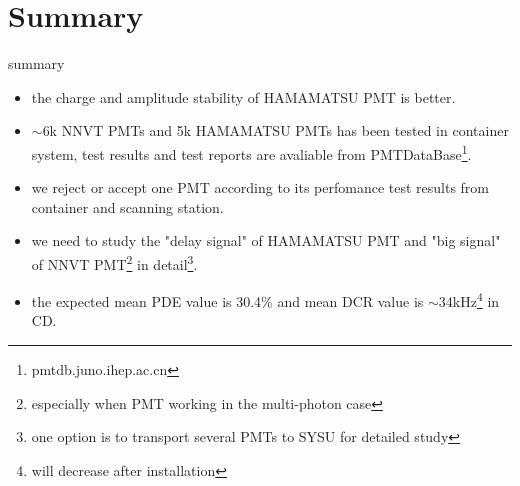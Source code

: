\section{Summary}

\begin{frame}{summary}
\begin{itemize}
\item  the charge and amplitude stability of HAMAMATSU PMT is better.
\item  $\sim$6k NNVT PMTs and 5k HAMAMATSU PMTs has been tested in container system, test results and test reports are avaliable from PMTDataBase\footnote{pmtdb.juno.ihep.ac.cn}.
\item we reject or accept one PMT according to its perfomance test results from container and scanning station.
\item  {\color{red}we need to study the "delay signal" of HAMAMATSU PMT and "big signal" of NNVT PMT\footnote{especially when PMT working in the multi-photon case}} in detail\footnote{one option is to transport several PMTs to SYSU for detailed study}.
\item the expected mean PDE value is 30.4\% and mean DCR value is $\sim$34kHz\footnote{will decrease after installation} in CD.
\end{itemize}
\end{frame}

\begin{frame}
\end{frame}

\begin{frame}
\end{frame}


